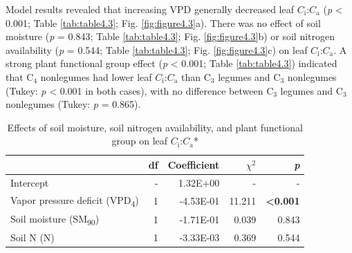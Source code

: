 Model results revealed that increasing VPD generally decreased leaf $C_\mathrm{i}$:$C_\mathrm{a}$ (\textit{p} < 0.001; Table \ref{tab:table4.3}; Fig. \ref{fig:figure4.3}a). There was no effect of soil moisture (\textit{p} = 0.843; Table \ref{tab:table4.3}; Fig. \ref{fig:figure4.3}b) or soil nitrogen availability (\textit{p} = 0.544; Table \ref{tab:table4.3}; Fig. \ref{fig:figure4.3}c) on leaf $C_\mathrm{i}$:$C_\mathrm{a}$. A strong plant functional group effect (\textit{p} < 0.001; Table \ref{tab:table4.3}) indicated that C$_4$ nonlegumes had lower leaf $C_\mathrm{i}$:$C_\mathrm{a}$ than C$_3$ legumes and C$_3$ nonlegumes (Tukey: \textit{p} < 0.001 in both cases), with no difference between C$_3$ legumes and C$_3$ nonlegumes (Tukey: \textit{p} = 0.865).

\newpage
\begin{table}
    \centering
    \caption{Effects of soil moisture, soil nitrogen availability, and plant functional group on leaf $C_\mathrm{i}$:$C_\mathrm{a}$*}
        \begin{tabular}{p{6cm}p{0.5cm}p{2cm}p{1.5cm}p{1.5cm}}
            \hline 
            & \multicolumn{1}{r}{df} 
            & \multicolumn{1}{r}{Coefficient} 
            & \multicolumn{1}{r}{$\chi^{2}$} 
            & \multicolumn{1}{r}{\textit{p}} 
            \\ 
            \hline
            
            Intercept
            & \multicolumn{1}{r}{-}
            & \multicolumn{1}{r}{1.32E+00}
            & \multicolumn{1}{r}{-}
            & \multicolumn{1}{r}{-}
            \\

            Vapor pressure deficit (VPD\textsubscript{4})
            & \multicolumn{1}{r}{1}
            & \multicolumn{1}{r}{-4.53E-01}
            & \multicolumn{1}{r}{11.211}
            & \multicolumn{1}{r}{\textbf{<0.001}}
            \\

            Soil moisture (SM\textsubscript{90})
            & \multicolumn{1}{r}{1}
            & \multicolumn{1}{r}{-1.71E-01}
            & \multicolumn{1}{r}{0.039}
            & \multicolumn{1}{r}{0.843}
            \\

            Soil N (N)
            & \multicolumn{1}{r}{1}
            & \multicolumn{1}{r}{-3.33E-03}
            & \multicolumn{1}{r}{0.369}
            & \multicolumn{1}{r}{0.544}
            \\


\end{tabular}
\end{table}
